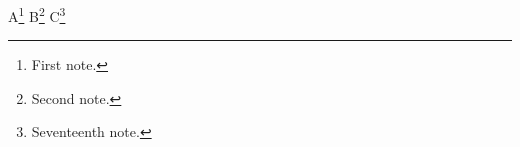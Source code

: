 \documentclass{article}
\begin{document}
A\footnote{First note.} B\footnote{Second note.}
\setcounter{footnote}{16}C\footnote{Seventeenth note.}
\end{document}
